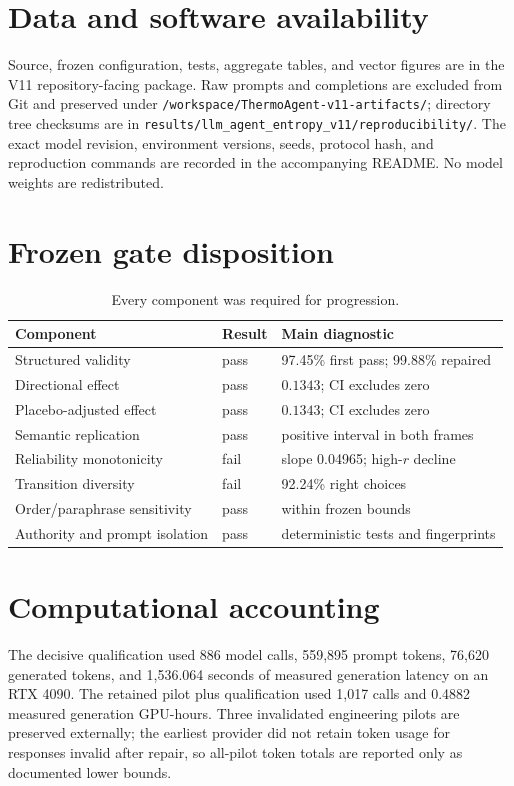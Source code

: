 \documentclass[12pt]{article}
\begin{document}
\section*{Data and software availability}

Source, frozen configuration, tests, aggregate tables, and vector figures are
in the V11 repository-facing package.  Raw prompts and completions are excluded
from Git and preserved under
\texttt{/workspace/ThermoAgent-v11-artifacts/}; directory tree checksums are in
\texttt{results/llm\_agent\_entropy\_v11/reproducibility/}.  The exact model
revision, environment versions, seeds, protocol hash, and reproduction commands
are recorded in the accompanying README.  No model weights are redistributed.

\appendix
\section{Frozen gate disposition}

\begin{table}[h]
\centering
\begin{tabular}{lll}
\toprule
Component & Result & Main diagnostic \\
\midrule
Structured validity & pass & 97.45\% first pass; 99.88\% repaired \\
Directional effect & pass & $0.1343$; CI excludes zero \\
Placebo-adjusted effect & pass & $0.1343$; CI excludes zero \\
Semantic replication & pass & positive interval in both frames \\
Reliability monotonicity & fail & slope 0.04965; high-$r$ decline \\
Transition diversity & fail & 92.24\% right choices \\
Order/paraphrase sensitivity & pass & within frozen bounds \\
Authority and prompt isolation & pass & deterministic tests and fingerprints \\
\bottomrule
\end{tabular}
\caption{Every component was required for progression.}
\end{table}

\section{Computational accounting}

The decisive qualification used 886 model calls, 559,895 prompt tokens, 76,620
generated tokens, and 1,536.064 seconds of measured generation latency on an
RTX 4090.  The retained pilot plus qualification used 1,017 calls and 0.4882
measured generation GPU-hours.  Three invalidated engineering pilots are
preserved externally; the earliest provider did not retain token usage for
responses invalid after repair, so all-pilot token totals are reported only as
documented lower bounds.



\end{document}
